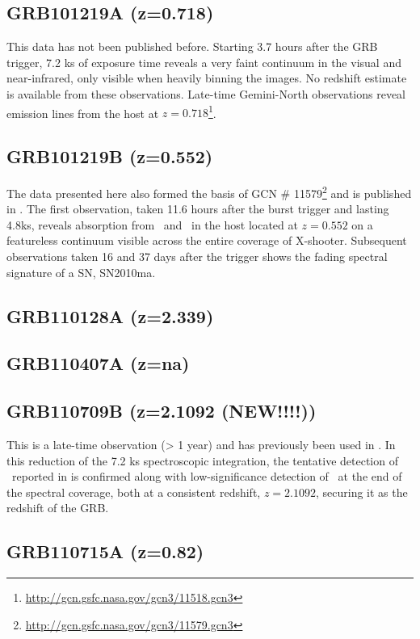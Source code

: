 \documentclass{aa}    %
\begin{document}
\subsection{GRB101219A (z=0.718)}
This data has not been published before. Starting 3.7 hours after the GRB
trigger, 7.2 ks of exposure time reveals a very faint continuum in the visual
and near-infrared, only visible when heavily binning the images. No redshift
estimate is available from these observations.  Late-time Gemini-North
observations reveal emission lines from the host at
$z=0.718$\footnote{\url{http://gcn.gsfc.nasa.gov/gcn3/11518.gcn3}}.

\subsection{GRB101219B (z=0.552)}
The data presented here also formed the basis of GCN \#
11579\footnote{\url{http://gcn.gsfc.nasa.gov/gcn3/11579.gcn3}} and is published
in \citet{Sparre2011}.	The first observation, taken 11.6 hours after the burst
trigger and lasting 4.8ks, reveals absorption from \mgii~and \mgi~in the host
located at $z = 0.552$ on a featureless continuum visible across the entire
coverage of X-shooter.  Subsequent observations taken 16 and 37 days after the
trigger shows the fading spectral signature of a SN, SN2010ma.


\subsection{GRB110128A (z=2.339)}

\subsection{GRB110407A (z=na)}

\subsection{GRB110709B (z=2.1092 (NEW!!!!))}
This is a late-time observation (> 1 year) and has previously been used in
\citet{Perley2016a}. In this reduction of the 7.2 ks spectroscopic integration,
the tentative detection of \oiii~reported in \citet{Perley2016a} is confirmed
along with low-significance detection of \ha~at the end of the spectral
coverage, both at a consistent redshift, $z=2.1092$, securing it as the redshift
of the GRB.


\subsection{GRB110715A (z=0.82)}
\end{document}
